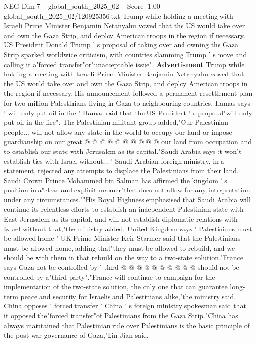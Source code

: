 \begin{textsample}{NEG Dim 7 – global\_south\_2025\_02 – Score -1.00 – global\_south\_2025\_02/120925356.txt}  \label{ex:f7_neg_033}
Trump while holding a meeting with Israeli Prime Minister Benjamin Netanyahu vowed that the US would take over and own the Gaza Strip, and deploy American troops in the region if necessary.
US President Donald Trump ' s proposal of taking over and owning the Gaza Strip sparked worldwide criticism, with countries slamming Trump ' s move and calling it a"forced transfer"or"unacceptable issue". \textbf{Advertisment} Trump while holding a meeting with Israeli Prime Minister Benjamin Netanyahu vowed that the US would take over and own the Gaza Strip, and deploy American troops in the region if necessary.
His announcement followed a permanent resettlement plan for two million Palestinians living in Gaza to neighbouring countries.
Hamas says ' will only put oil in fire ' Hamas said that the US President ' s proposal"will only put oil in the fire".
The Palestinian militant group added,"Our Palestinian people... will not allow any state in the world to occupy our land or impose guardianship on our great @ @ @ @ @ @ @ @ @ @ our land from occupation and to establish our state with Jerusalem as its capital."Saudi Arabia says it won't establish ties with Israel without... ' Saudi Arabian foreign ministry, in a statement, rejected any attempts to displace the Palestinians from their land.
Saudi Crown Prince Mohammed bin Salman has affirmed the kingdom ' s position in a"clear and explicit manner"that does not allow for any interpretation under any circumstances.""His Royal Highness emphasised that Saudi Arabia will continue its relentless efforts to establish an independent Palestinian state with East Jerusalem as its capital, and will not establish diplomatic relations with Israel without that,"the ministry added.
United Kingdom says ' Palestinians must be allowed home ' UK Prime Minister Keir Starmer said that the Palestinians must be allowed home, adding that"they must be allowed to rebuild, and we should be with them in that rebuild on the way to a two-state solution."France says Gaza not be controlled by ' third @ @ @ @ @ @ @ @ @ @ should not be controlled by a"third party"."France will continue to campaign for the implementation of the two-state solution, the only one that can guarantee long-term peace and security for Israelis and Palestinians alike,"the ministry said.
China opposes ' forced transfer ' China ' s foreign ministry spokesman said that it opposed the"forced transfer"of Palestinians from the Gaza Strip."China has always maintained that Palestinian rule over Palestinians is the basic principle of the post-war governance of Gaza,"Lin Jian said.

\end{textsample}

